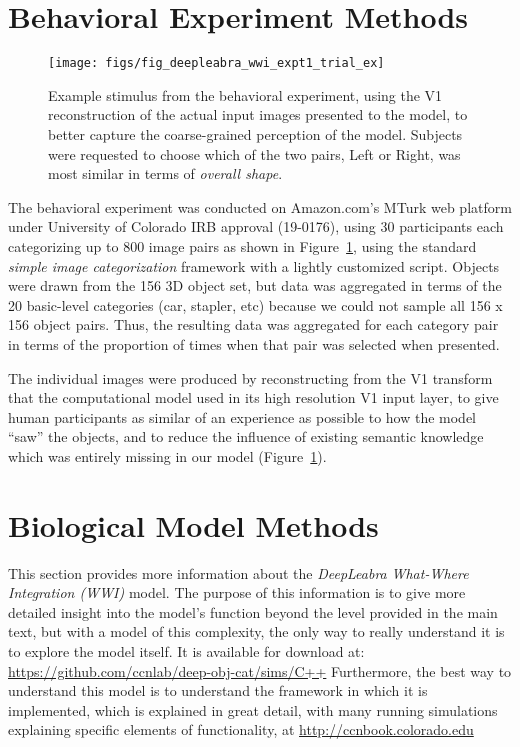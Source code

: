 \documentclass[12pt,twoside]{article}
\newif\myifpdf
\begin{document}

\section{Behavioral Experiment Methods}

\begin{figure}
  \centering\texttt{[image: figs/fig\_deepleabra\_wwi\_expt1\_trial\_ex]}
  \caption{Example stimulus from the behavioral experiment, using the V1 reconstruction of the actual input images presented to the model, to better capture the coarse-grained perception of the model.  Subjects were requested to choose which of the two pairs, Left or Right, was most similar in terms of {\em overall shape}.}
  \label{fig.expt}
\end{figure}

The behavioral experiment was conducted on Amazon.com's MTurk web platform under University of Colorado IRB approval (19-0176), using 30 participants each categorizing up to 800 image pairs as shown in Figure~\ref{fig.expt}, using the standard {\em simple image categorization} framework with a lightly customized script.  Objects were drawn from the 156 3D object set, but data was aggregated in terms of the 20 basic-level categories (car, stapler, etc) because we could not sample all 156 x 156 object pairs.  Thus, the resulting data was aggregated for each category pair in terms of the proportion of times when that pair was selected when presented.

The individual images were produced by reconstructing from the V1 transform that the computational model used in its high resolution V1 input layer, to give human participants as similar of an experience as possible to how the model ``saw'' the objects, and to reduce the influence of existing semantic knowledge which was entirely missing in our model (Figure~\ref{fig.expt}).

\section{Biological Model Methods}

This section provides more information about the {\em DeepLeabra} {\em What-Where Integration (WWI)} model.  The purpose of this information is to give more detailed insight into the model's function beyond the level provided in the main text, but with a model of this complexity, the only way to really understand it is to explore the model itself.  It is available for download at: \url{https://github.com/ccnlab/deep-obj-cat/sims/C++}  Furthermore, the best way to understand this model is to understand the framework in which it is implemented, which is explained in great detail, with many running simulations explaining specific elements of functionality, at \url{http://ccnbook.colorado.edu}
\end{document}
